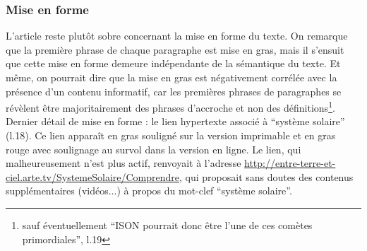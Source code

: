 \documentclass[a4paper,10pt]{article}
\begin{document}
		\subsubsection{Mise en forme}
			L'article reste plutôt sobre concernant la mise en forme du texte. On remarque que la première phrase de chaque paragraphe est mise en gras, mais il s'ensuit que cette mise en forme demeure indépendante de la sémantique du texte. Et même, on pourrait dire que la mise en gras est négativement corrélée avec la présence d'un contenu informatif, car les premières phrases de paragraphes se révèlent être majoritairement des phrases d'accroche et non des définitions\footnote{sauf éventuellement ``ISON pourrait donc être l'une de ces comètes primordiales'', l.19}.\\
			Dernier détail de mise en forme : le lien hypertexte associé à ``système solaire'' (l.18). Ce lien apparaît en gras souligné sur la version imprimable et en gras rouge avec soulignage au survol dans la version en ligne. Le lien, qui malheureusement n'est plus actif, renvoyait à l'adresse \url{http://entre-terre-et-ciel.arte.tv/SystemeSolaire/Comprendre}, qui proposait sans doutes des contenus supplémentaires (vidéos...) à propos du mot-clef ``système solaire''.
\end{document}
